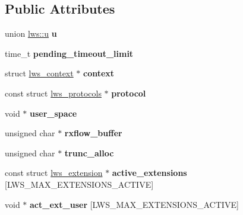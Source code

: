 \subsection*{Public Attributes}
\begin{DoxyCompactItemize}
\item 
\mbox{\label{structlws_a711fc9b4ff215f5ce3fa77c9c1945cb3}} 
union \hyperlink{unionlws_1_1u}{lws\+::u} {\bfseries u}
\item 
\mbox{\label{structlws_a40ea02347f88c31ce3eab00d3a095e71}} 
time\+\_\+t {\bfseries pending\+\_\+timeout\+\_\+limit}
\item 
\mbox{\label{structlws_aeaf75c7f628d252fcb5a6c01f29be85e}} 
struct \hyperlink{structlws__context}{lws\+\_\+context} $\ast$ {\bfseries context}
\item 
\mbox{\label{structlws_a69209b93b5a1cb564cebdc4b677b66ab}} 
const struct \hyperlink{structlws__protocols}{lws\+\_\+protocols} $\ast$ {\bfseries protocol}
\item 
\mbox{\label{structlws_a850143d00c6127244e5ca26ea6a97b6a}} 
void $\ast$ {\bfseries user\+\_\+space}
\item 
\mbox{\label{structlws_acc9855eed77f81dfbf77cfff027bf3d5}} 
unsigned char $\ast$ {\bfseries rxflow\+\_\+buffer}
\item 
\mbox{\label{structlws_a144feab3834eaef16f45ef8801db76d7}} 
unsigned char $\ast$ {\bfseries trunc\+\_\+alloc}
\item 
\mbox{\label{structlws_aa379ee98a18a24ff99d52f2e1d7bf449}} 
const struct \hyperlink{structlws__extension}{lws\+\_\+extension} $\ast$ {\bfseries active\+\_\+extensions} \mbox{[}L\+W\+S\+\_\+\+M\+A\+X\+\_\+\+E\+X\+T\+E\+N\+S\+I\+O\+N\+S\+\_\+\+A\+C\+T\+I\+VE\mbox{]}
\item 
\mbox{\label{structlws_a5f05ff5279cedeb25eb1a7560dee6663}} 
void $\ast$ {\bfseries act\+\_\+ext\+\_\+user} \mbox{[}L\+W\+S\+\_\+\+M\+A\+X\+\_\+\+E\+X\+T\+E\+N\+S\+I\+O\+N\+S\+\_\+\+A\+C\+T\+I\+VE\mbox{]}
\item 
\mbox{\label{structlws_a7cd8a597d0838bf388b183f59fd9edae}} 

\end{DoxyCompactItemize}
